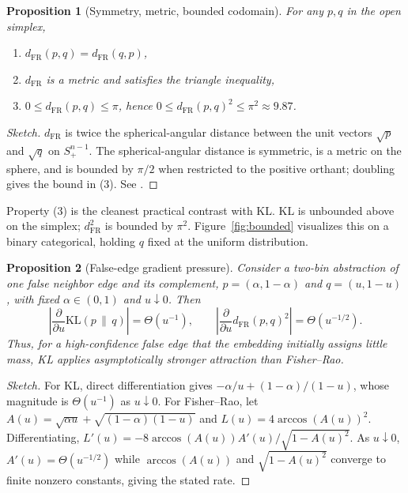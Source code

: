 \documentclass[11pt]{article}
\newtheorem{proposition}{Proposition}
\begin{document}
\begin{proposition}[Symmetry, metric, bounded codomain]
\label{prop:properties}
For any $p,q$ in the open simplex,
\begin{enumerate}
  \item $d_{\mathrm{FR}}(p,q) = d_{\mathrm{FR}}(q,p)$,
  \item $d_{\mathrm{FR}}$ is a metric and satisfies the triangle inequality,
  \item $0 \le d_{\mathrm{FR}}(p,q) \le \pi$, hence
        $0 \le d_{\mathrm{FR}}(p,q)^2 \le \pi^2 \approx 9.87$.
\end{enumerate}
\end{proposition}
\begin{proof}[Sketch]
$d_{\mathrm{FR}}$ is twice the spherical-angular distance between the unit vectors $\sqrt{p}$
and $\sqrt{q}$ on $S^{n-1}_{+}$. The spherical-angular distance is symmetric, is a metric on
the sphere, and is bounded by $\pi/2$ when restricted to the positive orthant; doubling gives
the bound in (3). See \citet{nielsen2020elementary}.
\end{proof}

Property (3) is the cleanest practical contrast with KL. KL is unbounded above on the simplex;
$d_{\mathrm{FR}}^2$ is bounded by $\pi^2$. Figure~\ref{fig:bounded} visualizes this on a binary
categorical, holding $q$ fixed at the uniform distribution.

\begin{proposition}[False-edge gradient pressure]
\label{prop:false-edge-gradient}
Consider a two-bin abstraction of one false neighbor edge and its complement,
$p=(\alpha,1-\alpha)$ and $q=(u,1-u)$, with fixed $\alpha\in(0,1)$ and $u\downarrow 0$.
Then
\[
  \left|\frac{\partial}{\partial u}\mathrm{KL}(p\,\|\,q)\right|
  = \Theta(u^{-1}),
  \qquad
  \left|\frac{\partial}{\partial u}d_{\mathrm{FR}}(p,q)^2\right|
  = \Theta(u^{-1/2}).
\]
Thus, for a high-confidence false edge that the embedding initially assigns little mass,
KL applies asymptotically stronger attraction than Fisher--Rao.
\end{proposition}
\begin{proof}[Sketch]
For KL, direct differentiation gives
$-\alpha/u + (1-\alpha)/(1-u)$, whose magnitude is $\Theta(u^{-1})$ as $u\downarrow 0$.
For Fisher--Rao, let
$A(u)=\sqrt{\alpha u}+\sqrt{(1-\alpha)(1-u)}$ and
$L(u)=4\arccos(A(u))^2$. Differentiating,
$L'(u)=-8\arccos(A(u))A'(u)/\sqrt{1-A(u)^2}$. As $u\downarrow 0$,
$A'(u)=\Theta(u^{-1/2})$ while $\arccos(A(u))$ and $\sqrt{1-A(u)^2}$ converge to finite
nonzero constants, giving the stated rate.
\end{proof}
\end{document}

